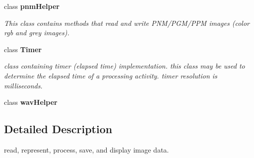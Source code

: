 \begin{CompactItemize}
class {\bf pnm\-Helper}
\begin{CompactList}\small\item\em This class contains methods that read and write PNM/PGM/PPM images (color rgb and grey images). \item\end{CompactList}\item 
class {\bf Timer}
\begin{CompactList}\small\item\em class containing timer (elapsed time) implementation. this class may be used to determine the elapsed time of a processing activity. timer resolution is milliseconds. \item\end{CompactList}\item 
class {\bf wav\-Helper}
\end{CompactItemize}


\subsection{Detailed Description}
read, represent, process, save, and display image data. 